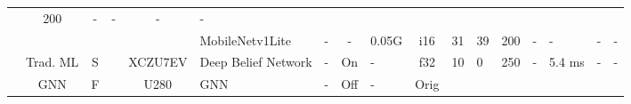 \documentclass{article}
\begin{document}
\begin{table}
\begin{adjustbox}{totalheight=\baselineskip,}
\begin{tabular}{ccccclp{2em}cp{3em}cp{2em}p{4em}p{3em}p{3.5em}p{3.5em}p{2.5em}p{3em}}
                                               &\multirow{1}{*}{200}
                                                   &\multirow{1}{*}{-}
                                                       &\multirow{1}{*}{-}
                                                           &\multirow{1}{*}{-}
                                                               &\multirow{1}{*}{-}\\
   &   &   &   &   &\multirow{1}{*}{MobileNetv1Lite}
                       &\multirow{1}{*}{-}
                           &\multirow{1}{*}{-}
                               &\multirow{1}{*}{0.05G}
                                   &\multirow{1}{*}{i16}
                                       &\multirow{1}{*}{31}
                                           &\multirow{1}{*}{39}
                                               &\multirow{1}{*}{200}
                                                   &\multirow{1}{*}{-}
                                                       &\multirow{1}{*}{-}
                                                           &\multirow{1}{*}{-}
                                                               &\multirow{1}{*}{-}\\
\cmidrule{2-17}
   &\multirow{1}{*}{Trad. ML}
       &\multirow{1}{*}{S}
           &\multirow{1}{*}{\cite{boyleHighlevelFPGADesign2023a}}
               &\multirow{1}{*}{XCZU7EV}
                   &\multirow{1}{*}{Deep Belief Network}
                       &\multirow{1}{*}{-}
                           &\multirow{1}{*}{On}
                               &\multirow{1}{*}{-}
                                   &\multirow{1}{*}{f32}
                                       &\multirow{1}{*}{10}
                                           &\multirow{1}{*}{0}
                                               &\multirow{1}{*}{250}
                                                   &\multirow{1}{*}{-}
                                                       &\multirow{1}{*}{5.4 ms}
                                                           &\multirow{1}{*}{-}
                                                               &\multirow{1}{*}{-}\\
\cmidrule{2-17}
   &\multirow{2}{*}{GNN}
       &\multirow{2}{*}{F}
           &\multirow{1}{*}{\cite{zhangAcceleratingGNNbasedSAR2023}}
               &\multirow{1}{*}{U280}
                   &\multirow{1}{*}{GNN}
                       &\multirow{1}{*}{-}
                           &\multirow{1}{*}{Off}
                               &\multirow{1}{*}{-}
                                   &\multirow{1}{*}{Orig}

\end{tabular}
\end{adjustbox}
\end{table}
\end{document}
